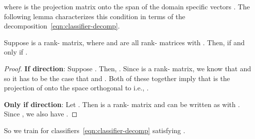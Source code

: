 \documentclass{article}
\begin{document}
where  is the projection matrix onto the span of the domain specific vectors . The following lemma characterizes this condition in terms of the decomposition~\eqref{eqn:classifier-decomp}.
\begin{lemma}\label{lem:char}
Suppose  is a rank- matrix, where  and  are all rank- matrices with . Then,  if and only if .
\end{lemma}
\begin{proof}
\textbf{If direction}: 
Suppose . Then, . Since  is a rank- matrix, we know that  and so it has to be the case that  and . Both of these together imply that  is the projection of  onto the space orthogonal to  i.e., .

\textbf{Only if direction}: Let . Then  is a rank- matrix and can be written as  with . Since , we also have .
\end{proof}
So we train for classifiers~\eqref{eqn:classifier-decomp} satisfying .
\end{document}
